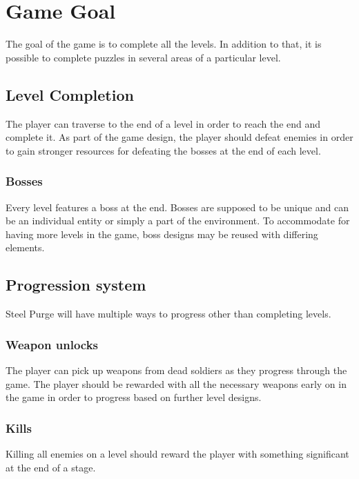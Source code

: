 \documentclass[../Main.tex]{subfiles}
\begin{document}
\section{Game Goal}

The goal of the game is to complete all the levels. In addition to that, it is possible to complete puzzles in several areas of a particular level. 

\subsection{Level Completion}

The player can traverse to the end of a level in order to reach the end and complete it. As part of the game design, the player should defeat enemies in order to gain stronger resources for defeating the bosses at the end of each level.

\subsubsection{Bosses}

Every level features a boss at the end. Bosses are supposed to be unique and can be an individual entity or simply a part of the environment. To accommodate for having more levels in the game, boss designs may be reused with differing elements.  

\subsection{Progression system}

Steel Purge will have multiple ways to progress other than completing levels.

\subsubsection{Weapon unlocks}

The player can pick up weapons from dead soldiers as they progress through the game. The player should be rewarded with all the necessary weapons early on in the game in order to progress based on further level designs. 

\subsubsection{Kills}

Killing all enemies on a level should reward the player with something significant at the end of a stage. 
\end{document}
